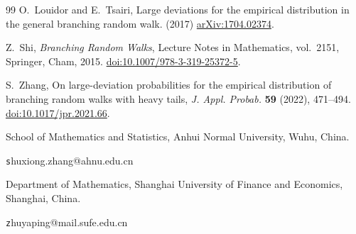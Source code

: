 \documentclass[a4paper, 11pt]{article}
\newcommand{\1}{\mathbf 1}
\theoremstyle{plain}
\begin{document}
\begin{thebibliography}{99}
O.~Louidor and E.~Tsairi,
\newblock Large deviations for the empirical distribution in the general
branching random walk. (2017)
\newblock \href{https://arxiv.org/abs/1704.02374}{arXiv:1704.02374}.

Z.~Shi,
\newblock \emph{Branching Random Walks},
\newblock Lecture Notes in Mathematics, vol.~2151, Springer, Cham, 2015.
\newblock \href{https://doi.org/10.1007/978-3-319-25372-5}
{doi:10.1007/978-3-319-25372-5}.


S.~Zhang,
\newblock On large-deviation probabilities for the empirical distribution
of branching random walks with heavy tails,
\newblock \emph{J. Appl. Probab.} \textbf{59} (2022), 471--494.
\newblock \href{https://doi.org/10.1017/jpr.2021.66}
{doi:10.1017/jpr.2021.66}.

\end{thebibliography}
\vspace{2cm}
	
	 \smallskip		
     School of Mathematics and Statistics, Anhui Normal University, Wuhu, China.

    {\texttt
   	shuxiong.zhang@ahnu.edu.cn}

	  Department of Mathematics, Shanghai University of Finance and Economics, Shanghai, China.
	
	 {\texttt
		zhuyaping@mail.sufe.edu.cn}	
\end{document}

